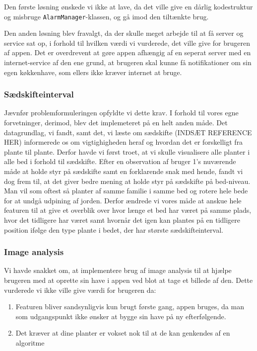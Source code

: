 Den første løsning ønskede vi ikke at lave, da det ville give en dårlig kodestruktur og misbruge \texttt{AlarmManager}-klassen, og gå imod den tiltænkte brug.

Den anden løsning blev fravalgt, da der skulle meget arbejde til at få server og service sat op, i forhold til hvilken værdi vi vurderede, det ville give for brugeren af appen. Det er overdrevent at gøre appen afhængig af en seperat server med en internet-service af den ene grund, at brugeren skal kunne få notifikationer om sin egen køkkenhave, som ellers ikke kræver internet at bruge.

\subsubsection{Sædskifteinterval}
Jævnfør problemformuleringen opfyldte vi dette krav. I forhold til vores egne forvetninger, derimod, blev det implemeteret på en helt anden måde. Det datagrundlag, vi fandt, samt det, vi læste om sædskifte (INDSÆT REFERENCE HER) informerede os om vigtighigheden heraf og hvordan det er forskelligt fra plante til plante. Derfor havde vi først troet, at vi skulle visualisere alle planter i alle bed i forhold til sædskifte. Efter en observation af bruger 1's nuværende måde at holde styr på sædskifte samt en forklarende snak med hende, fandt vi dog frem til, at det giver bedre mening at holde styr på sædskifte på bed-niveau. Man vil som oftest så planter af samme familie i samme bed og rotere hele bede for at undgå udpining af jorden. Derfor ændrede vi vores måde at anskue hele featuren til at give et overblik over hvor længe et bed har været på samme plads, hvor det tidligere har været samt hvornår det igen kan plantes på en tidligere position ifølge den type plante i bedet, der har største sædskifteinterval.

\subsubsection{Image analysis}
Vi havde snakket om, at implementere brug af image analysis til at hjælpe brugeren med at oprette sin have i appen ved blot at tage et billede af den. Dette vurderede vi ikke ville give værdi for brugeren da:
\begin{enumerate}
        \item Featuren bliver sandsynligvis kun brugt første gang, appen bruges, da man som udgangspunkt ikke ønsker at bygge sin have på ny efterfølgende. 
        \item Det kræver at dine planter er vokset nok til at de kan genkendes af en algoritme
\end{enumerate}

